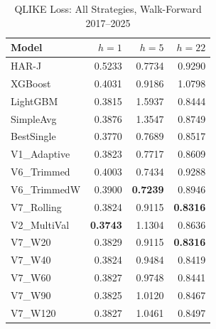 \begin{table}[htbp]
\centering
\caption{QLIKE Loss: All Strategies, Walk-Forward 2017--2025}
\label{tab:qlike_all}
\begin{tabular}{lrrr}
\toprule
Model & $h=1$ & $h=5$ & $h=22$ \\
\midrule
HAR-J & 0.5233 & 0.7734 & 0.9290 \\
XGBoost & 0.4031 & 0.9186 & 1.0798 \\
LightGBM & 0.3815 & 1.5937 & 0.8444 \\
SimpleAvg & 0.3876 & 1.3547 & 0.8749 \\
BestSingle & 0.3770 & 0.7689 & 0.8517 \\
V1\_Adaptive & 0.3823 & 0.7717 & 0.8609 \\
V6\_Trimmed & 0.4003 & 0.7434 & 0.9288 \\
V6\_TrimmedW & 0.3900 & \textbf{0.7239} & 0.8946 \\
V7\_Rolling & 0.3824 & 0.9115 & \textbf{0.8316} \\
V2\_MultiVal & \textbf{0.3743} & 1.1304 & 0.8636 \\
V7\_W20 & 0.3829 & 0.9115 & \textbf{0.8316} \\
V7\_W40 & 0.3824 & 0.9484 & 0.8419 \\
V7\_W60 & 0.3827 & 0.9748 & 0.8441 \\
V7\_W90 & 0.3825 & 1.0120 & 0.8467 \\
V7\_W120 & 0.3827 & 1.0461 & 0.8497 \\
\bottomrule
\end{tabular}
\end{table}